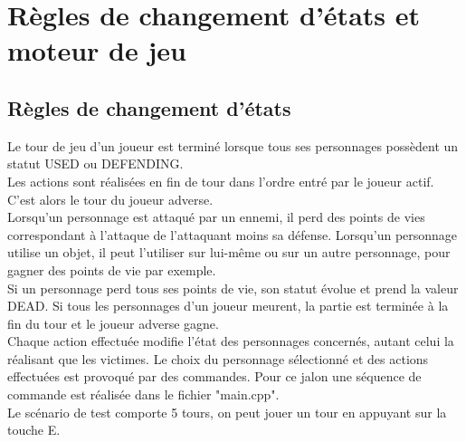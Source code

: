 \chapter{Règles de changement d’états et moteur de jeu}

\section{Règles de changement d’états}

Le tour de jeu d’un joueur est terminé lorsque tous ses personnages possèdent un statut USED ou DEFENDING.
\\Les actions sont réalisées en fin de tour dans l'ordre entré par le joueur actif. 
C’est alors le tour du joueur adverse.
\\Lorsqu’un personnage est attaqué par un ennemi, il perd des points de vies correspondant à 
l'attaque de l'attaquant moins sa défense.
Lorsqu’un personnage utilise un objet, il peut l'utiliser sur lui-même ou sur 
un autre personnage, pour gagner des points de vie par exemple.
\\Si un personnage perd tous ses points de vie, son statut évolue et prend la valeur DEAD.
Si tous les personnages d’un joueur meurent, la partie est terminée 
à la fin du tour et le joueur adverse gagne.
\\Chaque action effectuée modifie l’état des personnages concernés, 
autant celui la réalisant que les victimes. 
Le choix du personnage sélectionné et des actions effectuées est provoqué par des commandes.
Pour ce jalon une séquence de commande est réalisée dans le fichier "main.cpp".
\\Le scénario de test comporte 5 tours, on peut jouer un tour en appuyant sur la touche E.


